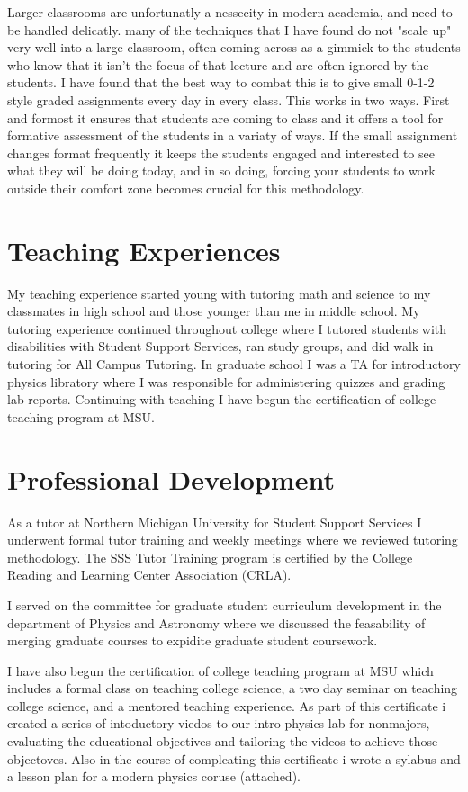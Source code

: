 \documentclass{article}
\begin{document}
Larger classrooms are unfortunatly a nessecity in modern academia, and need to be handled delicatly. many of the techniques that I have found do not "scale up" very well into a large classroom, often coming across as a gimmick to the students who know that it isn't the focus of that lecture and are often ignored by the students. I have found that the best way to combat this is to give small 0-1-2 style graded assignments every day in every class. This works in two ways. First and formost it ensures that students are coming to class and it offers a tool for formative assessment of the students in a variaty of ways. If the small assignment changes format frequently it keeps the students engaged and interested to see what they will be doing today, and in so doing, forcing your students to work outside their comfort zone becomes crucial for this methodology. 


\newpage
\section{Teaching Experiences}
My teaching experience started young with tutoring math and science to my classmates in high school and those younger than me in middle school. My tutoring experience continued throughout college where I tutored students with disabilities with Student Support Services, ran study groups, and did walk in tutoring for All Campus Tutoring. In graduate school I was a TA for introductory physics libratory where I was responsible for administering quizzes and grading lab reports. Continuing with teaching I have begun the certification of college teaching program at MSU.

\section{Professional Development}
As a tutor at Northern Michigan University for Student Support Services I underwent formal tutor training and weekly meetings where we reviewed tutoring methodology. The SSS Tutor Training program is certified by the College Reading and Learning Center Association (CRLA). 

I served on the committee for graduate student curriculum development in the department of Physics and Astronomy where we discussed the feasability of merging graduate courses to expidite graduate student coursework. 

I have also begun the certification of college teaching program at MSU which includes a formal class on teaching college science, a two day seminar on teaching college science, and a mentored teaching experience. As part of this certificate i created a series of intoductory viedos to our intro physics lab for nonmajors, evaluating the educational objectives and tailoring the videos to achieve those objectoves. Also in the course of compleating this certificate i wrote a sylabus and a lesson plan for a modern physics coruse (attached). 
\end{document}

